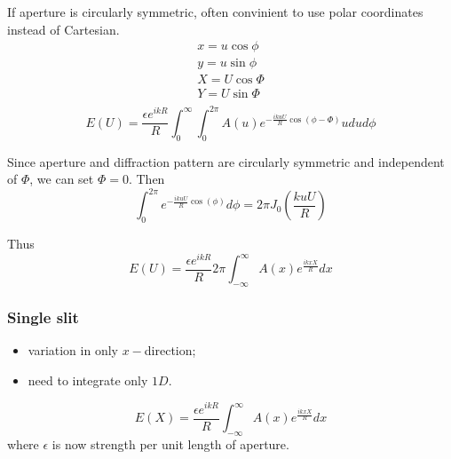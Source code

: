 \documentclass[10pt]{article}
\begin{document}
If aperture is circularly symmetric, often convinient to use polar coordinates instead of Cartesian.
\begin{equation*}
\begin{gathered}
x = u \cos{\phi}\\
y = u \sin{\phi}\\
X = U \cos{\Phi}\\
Y = U \sin{\Phi}\\
\end{gathered}
\end{equation*}
\begin{equation}\boxed{
E(U) = \frac{\epsilon e^{ikR}}{R} \int_{0} ^\infty \int_{0} ^{2\pi} A(u)e^{-\frac{ikuU}{R}\cos{(\phi - \Phi)}} udud\phi
}\end{equation}

Since aperture and diffraction pattern are circularly symmetric and independent of $\Phi$, we can set $\Phi = 0$. Then
\begin{equation*}
\int_{0} ^{2\pi} e^{-\frac{ikuU}{R}\cos{(\phi)}} d\phi = 2\pi J_0 \left(\frac{kuU}{R} \right)
\end{equation*}

Thus
\begin{equation}\boxed{
E(U) = \frac{\epsilon e^{ikR}}{R} 2\pi \int_{-\infty} ^\infty A(x)e^{\frac{ikxX}{R}}dx
}\end{equation}

\subsubsection{Single slit}
\begin{itemize}
\item variation in only $x-$direction;
\item need to integrate only $1D$.
\end{itemize}
\begin{equation*}
E(X) = \frac{\epsilon e^{ikR}}{R} \int_{-\infty} ^\infty A(x)e^{\frac{ikxX}{R}}dx
\end{equation*}
where $\epsilon$ is now strength per unit length of aperture.
\end{document}
